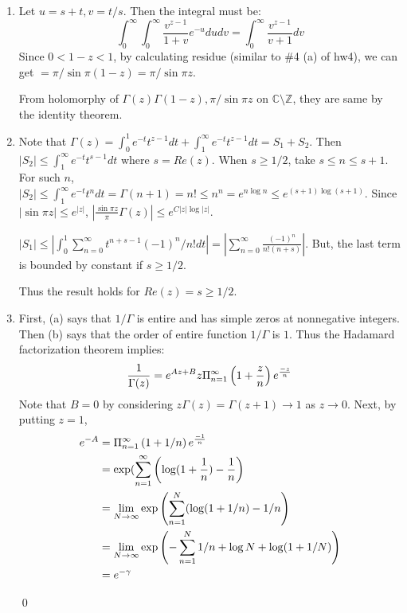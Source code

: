 \begin{problem}[10.2] \hfill
	\begin{enumerate}[label = (\alph*)]
		\item Let $u = s+t, v = t/s$. Then the integral must be:
			\[
				\int_0^\infty \int_0^\infty \frac{v^{z-1}}{1+v}e^{-u}dudv = \int_0^\infty \frac{v^{z-1}}{v+1}dv
			\]
			Since $0<1-z<1$, by calculating residue (similar to \#4 (a) of hw4), we can get $ = \pi / \sin \pi(1-z) = \pi / \sin \pi z$.

			From holomorphy of $\Gamma(z) \Gamma(1-z), \pi/\sin\pi z$ on $\mathbb{C} \setminus \mathbb{Z}$, they are same by the identity theorem.

		\item Note that $\Gamma(z) = \int_0^1 e^{-t}t^{z-1} dt + \int_1^\infty e^{-t}t^{z-1}dt = S_1 + S_2$.
			Then $|S_2| \leq \int_1^\infty e^{-t}t^{s-1} dt$ where $s = Re(z)$.
			When $s \geq 1/2$, take $s \leq n \leq s+1$.
			For such $n$, $|S_2| \leq \int_1^\infty e^{-t}t^n dt = \Gamma(n+1) = n! \leq n^n = e^{n\log n}
			\leq e^{(s+1) \log(s+1)}$.
			Since $| \sin \pi z | \leq e^{|z|}$, $\left | \frac{\sin \pi z}{\pi} \Gamma(z) \right | \leq e^{C|z| \log |z|}$.

			$|S_1| \leq |\int_0^1 \sum_{n=0}^\infty t^{n+s-1}(-1)^n/n! dt| = |\sum_{n=0}^\infty \frac{(-1)^n}{n!(n+s)}|$.
			But, the last term is bounded by constant if $s\geq 1/2$.

			Thus the result holds for $Re(z) = s \geq 1/2$.

		\item First, (a) says that $1/\Gamma$ is entire and has simple zeros at nonnegative integers.
			Then (b) says that the order of entire function $1/\Gamma$ is $1$.
			Thus the Hadamard factorization theorem implies:
			\[
				\frac{1}{\Gamma(z)} = e^{Az + B} z \Pi_{n=1}^\infty \left( 1+\frac{z}{n} \right)e^{-z \over n}
			\]
			Note that $B = 0$ by considering $z \Gamma(z) = \Gamma(z+1) \rightarrow 1$ as $z \rightarrow 0$.
			Next, by putting $z = 1$,
			\[
				\begin{split}
					e^{-A} 
					& = \Pi_{n=1}^{\infty}\left( 1+1/n \right)e^{-1 \over n} \\
					& = \exp(\sum_{n=1}^\infty \left( \log (1+ {1\over n} ) - {1 \over n} \right) \\
					& = \lim_{N\rightarrow \infty} \exp\left( \sum_{n=1}^N (\log(1+1/n) - 1/n \right) \\
					& = \lim_{N\rightarrow \infty} \exp\left( -\sum_{n=1}^N 1/n + \log N +\log(1+1/N) \right) \\
					& = e^{-\gamma}
				\end{split}
			\]

			\qed
	\end{enumerate}
	
\end{problem}

